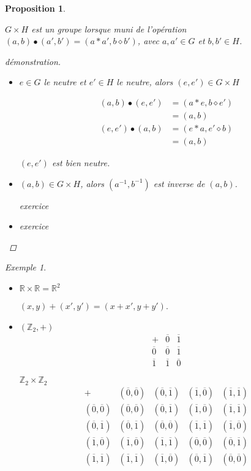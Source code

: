 \documentclass{report}
\newtheorem*{prop}{Proposition}
\theoremstyle{definition}
\theoremstyle{remark}
\newtheorem*{exem}{Exemple}
\begin{document}
	\begin{prop}
		~

		$G \times H$ est un groupe lorsque muni de l'op\'eration $(a,b) \bullet (a',b') = (a*a',b \diamond b')$, avec $a,a' \in G$ et $b,b' \in H$.
		\begin{proof}[d\'emonstration]~

			\begin{itemize}
				\item[$(N)$] $e \in G$ le neutre et $e' \in H$ le neutre, alors $(e,e') \in G \times H$

				\begin{align*}
					(a,b) \bullet (e,e')&= (a*e, b \diamond e')\\
					&= (a,b)\\
					(e,e') \bullet (a,b)&= (e*a, e' \diamond b)\\
					&= (a,b)
				\end{align*}

				$(e,e')$ est bien neutre.
				\item[$(I)$] $(a,b) \in G \times H$, alors $(a^{-1},b^{-1})$ est inverse de $(a,b)$.

				exercice
				\item[$(A)$] exercice
			\end{itemize}
		\end{proof}
	\end{prop}
	\begin{exem}
		\begin{itemize}
			\item $\mathbb{R} \times \mathbb{R} = \mathbb{R}^2$

			$(x,y)+(x',y')=(x+x',y+y')$.
			\item $(\mathbb{Z}_2,+)$
			\renewcommand{\arraystretch}{1.5}
			\[
			\begin{array}{c||c|c}
				+&\overline0&\overline1\\
				\hline\hline
				\overline0&\overline0&\overline1\\
				\hline
				\overline1&\overline1&\overline0
			\end{array}
			\]

			$\mathbb{Z}_2 \times \mathbb{Z}_2$
			\[
			\begin{array}{c||c|c|c|c}
				+&(\overline0,\overline0)& (\overline0,\overline1)& (\overline1,\overline0)& (\overline1,\overline1)\\
				\hline\hline
				(\overline0,\overline0)& (\overline0,\overline0)& (\overline0,\overline1)& (\overline1,\overline0)& (\overline1,\overline1)\\
				\hline
				(\overline0,\overline1)& (\overline0,\overline1)& (\overline0,\overline0)& (\overline1,\overline1)& (\overline1,\overline0)\\
				\hline
				(\overline1,\overline0)& (\overline1,\overline0)& (\overline1,\overline1)& (\overline0,\overline0)& (\overline0,\overline1)\\
				\hline
				(\overline1,\overline1)& (\overline1,\overline1)& (\overline1,\overline0)& (\overline0,\overline1)& (\overline0,\overline0)
			\end{array}
			\]
			\renewcommand{\arraystretch}{1}
		\end{itemize}
	\end{exem}
\end{document}
